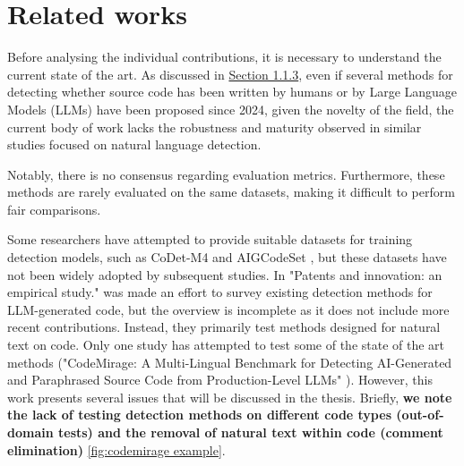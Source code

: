 \clearpage

\chapter{Related works}

Before analysing the individual contributions, 
it is necessary to understand the current state 
of the art. As discussed in
\hyperref[sec:Challenges in LLM-Generated Code Detection]{Section 1.1.3}, 
even if several methods for detecting whether source code has been written 
by humans or by Large Language Models (LLMs) have been proposed since 2024, 
given the novelty of the field, the current body of work lacks the 
robustness and maturity observed in similar studies focused on natural 
language detection. 

Notably, there is no consensus regarding evaluation 
metrics. Furthermore, these methods are rarely evaluated on the same datasets, 
making it difficult to perform fair comparisons.

Some researchers have attempted to provide suitable datasets for training 
detection models, such as CoDet-M4 \cite{orel2025codet,} and 
AIGCodeSet \cite{demirok2024aigcodeset}, but 
these datasets have not been widely adopted by subsequent studies. 
In "Patents and innovation: an empirical study." \cite{suh2024empirical} 
was made an effort to survey existing detection methods for 
LLM-generated code, but the overview is incomplete as it does not include 
more recent contributions. Instead, they primarily test methods designed for natural text on code.
Only one study has attempted to test some of the state of the art methods 
("CodeMirage: A Multi-Lingual Benchmark for Detecting AI-Generated and 
Paraphrased Source Code from Production-Level LLMs" \cite{guo2025codemirage}). 
However, this work presents several issues that 
will be discussed in the thesis.
Briefly, \textbf{we note the lack of testing detection methods on 
different code types (out-of-domain tests) and the removal of natural 
text within code (comment elimination)} \ref{fig:codemirage example}.

